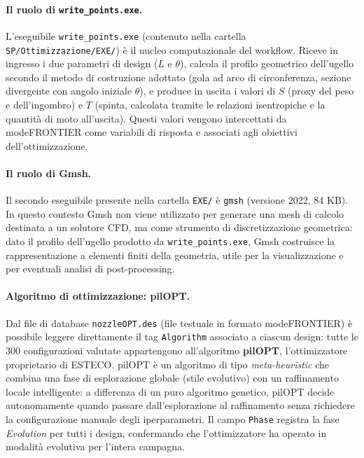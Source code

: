\paragraph{Il ruolo di \texttt{write\_points.exe}.}
L'eseguibile \texttt{write\_points.exe} (contenuto nella cartella
\texttt{SP/Ottimizzazione/EXE/}) è il nucleo computazionale del workflow.
Riceve in ingresso i due parametri di design ($L$ e $\theta$), calcola il
profilo geometrico dell'ugello secondo il metodo di costruzione adottato
(gola ad arco di circonferenza, sezione divergente con angolo iniziale
$\theta$), e produce in uscita i valori di $S$ (proxy del peso e dell'ingombro)
e $T$ (spinta, calcolata tramite le relazioni isentropiche e la quantità di
moto all'uscita).
Questi valori vengono intercettati da modeFRONTIER come variabili di risposta
e associati agli obiettivi dell'ottimizzazione.

\paragraph{Il ruolo di Gmsh.}
Il secondo eseguibile presente nella cartella \texttt{EXE/} è \texttt{gmsh}
(versione 2022, 84 KB).
In questo contesto Gmsh non viene utilizzato per generare una mesh di calcolo
destinata a un solutore CFD, ma come strumento di discretizzazione geometrica:
dato il profilo dell'ugello prodotto da \texttt{write\_points.exe}, Gmsh
costruisce la rappresentazione a elementi finiti della geometria, utile per
la visualizzazione e per eventuali analisi di post-processing.

\paragraph{Algoritmo di ottimizzazione: pilOPT.}
Dal file di database \texttt{nozzleOPT.des} (file testuale in formato
modeFRONTIER) è possibile leggere direttamente il tag \texttt{Algorithm}
associato a ciascun design: tutte le 300 configurazioni valutate appartengono
all'algoritmo \textbf{pilOPT}, l'ottimizzatore proprietario di ESTECO.
pilOPT è un algoritmo di tipo \textit{meta-heuristic} che combina una fase
di esplorazione globale (stile evolutivo) con un raffinamento locale
intelligente: a differenza di un puro algoritmo genetico, pilOPT decide
autonomamente quando passare dall'esplorazione al raffinamento senza
richiedere la configurazione manuale degli iperparametri.
Il campo \texttt{Phase} registra la fase \textit{Evolution} per tutti i design,
confermando che l'ottimizzatore ha operato in modalità evolutiva per l'intera
campagna.

